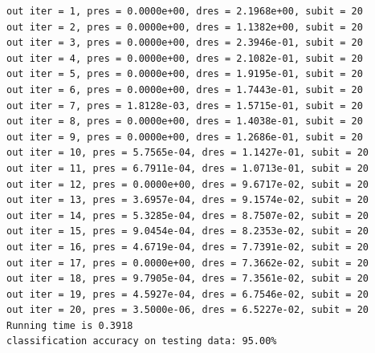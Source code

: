 \documentclass[12pt]{article}
\begin{document}
\begin{verbatim}
out iter = 1, pres = 0.0000e+00, dres = 2.1968e+00, subit = 20
out iter = 2, pres = 0.0000e+00, dres = 1.1382e+00, subit = 20
out iter = 3, pres = 0.0000e+00, dres = 2.3946e-01, subit = 20
out iter = 4, pres = 0.0000e+00, dres = 2.1082e-01, subit = 20
out iter = 5, pres = 0.0000e+00, dres = 1.9195e-01, subit = 20
out iter = 6, pres = 0.0000e+00, dres = 1.7443e-01, subit = 20
out iter = 7, pres = 1.8128e-03, dres = 1.5715e-01, subit = 20
out iter = 8, pres = 0.0000e+00, dres = 1.4038e-01, subit = 20
out iter = 9, pres = 0.0000e+00, dres = 1.2686e-01, subit = 20
out iter = 10, pres = 5.7565e-04, dres = 1.1427e-01, subit = 20
out iter = 11, pres = 6.7911e-04, dres = 1.0713e-01, subit = 20
out iter = 12, pres = 0.0000e+00, dres = 9.6717e-02, subit = 20
out iter = 13, pres = 3.6957e-04, dres = 9.1574e-02, subit = 20
out iter = 14, pres = 5.3285e-04, dres = 8.7507e-02, subit = 20
out iter = 15, pres = 9.0454e-04, dres = 8.2353e-02, subit = 20
out iter = 16, pres = 4.6719e-04, dres = 7.7391e-02, subit = 20
out iter = 17, pres = 0.0000e+00, dres = 7.3662e-02, subit = 20
out iter = 18, pres = 9.7905e-04, dres = 7.3561e-02, subit = 20
out iter = 19, pres = 4.5927e-04, dres = 6.7546e-02, subit = 20
out iter = 20, pres = 3.5000e-06, dres = 6.5227e-02, subit = 20
Running time is 0.3918
classification accuracy on testing data: 95.00%
\end{verbatim}
$$
$$
\end{document}
